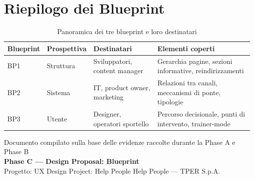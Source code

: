 \documentclass[11pt,a4paper]{article}
\begin{document}
\vspace{0.5cm}

\section{Riepilogo dei Blueprint}

\begin{table}[H]
\centering
\small
\renewcommand{\arraystretch}{1.3}
\begin{tabular}{|p{1.8cm}|p{3cm}|p{3.5cm}|p{5cm}|}
\hline
\textbf{Blueprint} & \textbf{Prospettiva} & \textbf{Destinatari} & \textbf{Elementi coperti} \\
\hline
BP1 & Struttura & Sviluppatori, content manager & Gerarchia pagine, sezioni informative, reindirizzamenti \\
\hline
BP2 & Sistema & IT, product owner, marketing & Relazioni tra canali, meccanismi di ponte, tipologie \\
\hline
BP3 & Utente & Designer, operatori sportello & Percorso decisionale, punti di intervento, trainer-mode \\
\hline
\end{tabular}
\caption{Panoramica dei tre blueprint e loro destinatari}
\label{tab:riepilogo-bp}
\end{table}

\vspace{0.5cm}

\begin{center}
{\color{secondaryColor}\small
Documento compilato sulla base delle evidenze raccolte durante la Phase A e Phase B \\[4pt]
\textbf{Phase C --- Design Proposal: Blueprint} \\[4pt]
Progetto: UX Design Project: Help People Help People --- TPER S.p.A.}
\end{center}
\end{document}
